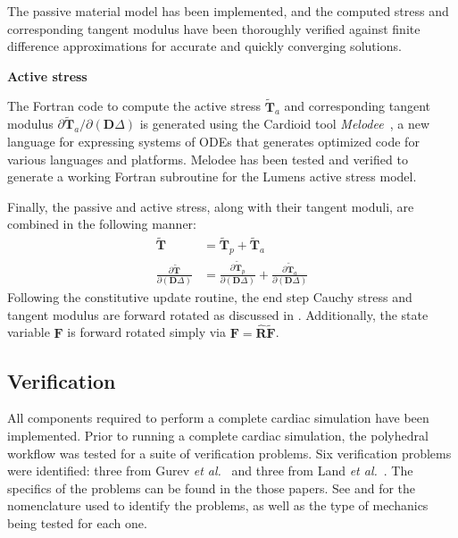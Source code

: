 The passive material model has been implemented, and the computed stress and corresponding tangent modulus have been thoroughly verified against finite difference approximations for accurate and quickly converging solutions.

\textbf{Active stress}

The Fortran code to compute the active stress $\tilde{\bm{T}}_a$ and corresponding tangent modulus ${\partial \tilde{\bm{T}}_a}/{\partial (\bm{D}\Delta)}$ is generated using the Cardioid tool \textit{Melodee}~\cite{melodee}, a new language for expressing systems of ODEs that generates optimized code for various languages and platforms. Melodee has been tested and verified to generate a working Fortran subroutine for the Lumens active stress model.

Finally, the passive and active stress, along with their tangent moduli, are combined in the following manner:
\begin{align}
\tilde{\bm{T}} &= \tilde{\bm{T}}_p + \tilde{\bm{T}}_a \\
\frac{\partial \tilde{\bm{T}}}{\partial (\bm{D}\Delta)} &= \frac{\partial \tilde{\bm{T}}_p}{\partial (\bm{D}\Delta)}+ \frac{\partial \tilde{\bm{T}}_a}{\partial (\bm{D}\Delta)}
\end{align}
Following the constitutive update routine, the end step Cauchy stress and tangent modulus are forward rotated as discussed in . Additionally, the state variable $\bm{F}$ is forward rotated simply via $\bm{F} =\hat{\bm{R}}\tilde{\bm{F}}$.


\subsection{Verification}

All components required to perform a complete cardiac simulation have been implemented. Prior to running a complete cardiac simulation, the polyhedral workflow was tested for a suite of verification problems. Six verification problems were identified: three from Gurev \textit{et al.}~\cite{gurev_2015} and three from Land \textit{et al.}~\cite{land_2015}. The specifics of the problems can be found in the those papers. See  and  for the nomenclature used to identify the problems, as well as the type of mechanics being tested for each one.

